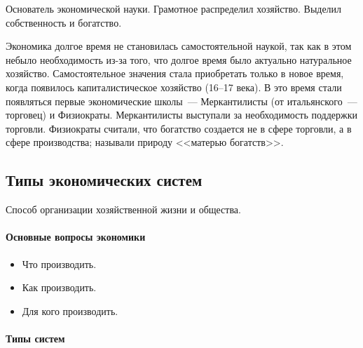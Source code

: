 \documentclass[12pt]{article}
\begin{document}
	\begin{person}[Аристотель]
		Основатель экономической науки. Грамотное распределил хозяйство. Выделил собственность и богатство.
	\end{person}
	
	\begin{note}
		Экономика долгое время не становилась самостоятельной наукой, так как в этом небыло необходимость из-за того, что долгое время было актуально натуральное хозяйство. Самостоятельное значения стала приобретать только в новое время, когда появилось капиталистическое хозяйство (16--17 века). В это время стали появляться первые экономические школы~--- Меркантилисты (от итальянского~--- торговец) и Физиократы. Меркантилисты выступали за необходимость поддержки торговли. Физиократы считали, что богатство создается не в сфере торговли, а в сфере производства; называли природу <<матерью богатств>>.
	\end{note}
	
	\subsection{Типы экономических систем}
	
	\begin{definition}
		Способ организации хозяйственной жизни и общества.
	\end{definition}
	
	\paragraph{Основные вопросы экономики}
	
	\begin{itemize}
		\item Что производить.
		\item Как производить.
		\item Для кого производить.
	\end{itemize}
	
	\paragraph{Типы систем}
	
\end{document}
